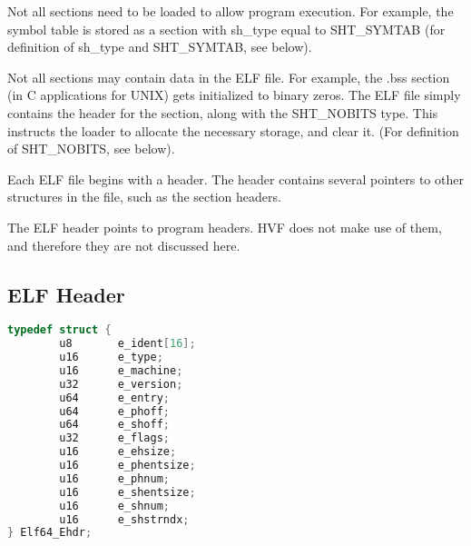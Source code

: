 Not all sections need to be loaded to allow program execution.  For example,
the symbol table is stored as a section with sh\_type equal to SHT\_SYMTAB
(for definition of sh\_type and SHT\_SYMTAB, see below).

Not all sections may contain data in the ELF file.  For example, the .bss
section (in C applications for UNIX) gets initialized to binary zeros.  The
ELF file simply contains the header for the section, along with the
SHT\_NOBITS type.  This instructs the loader to allocate the necessary
storage, and clear it.  (For definition of SHT\_NOBITS, see below).

Each ELF file begins with a header.  The header contains several pointers to
other structures in the file, such as the section headers.

The ELF header points to program headers.  HVF does not make use of them,
and therefore they are not discussed here.
\cbend

\cbstart
\subsection{ELF Header}
\cbend

\cbdelete
\begin{lstlisting}[language=C]
typedef struct {
        u8       e_ident[16];
        u16      e_type;
        u16      e_machine;
        u32      e_version;
        u64      e_entry;
        u64      e_phoff;
        u64      e_shoff;
        u32      e_flags;
        u16      e_ehsize;
        u16      e_phentsize;
        u16      e_phnum;
        u16      e_shentsize;
        u16      e_shnum;
        u16      e_shstrndx;
} Elf64_Ehdr;
\end{lstlisting}


